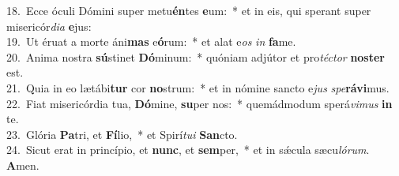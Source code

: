 {18.~}Ecce óculi Dómini super metu\textbf{én}tes \textbf{e}um:~* et in eis, qui sperant super misericór\textit{di}\textit{a} \textbf{e}jus:\\
{19.~}Ut éruat a morte áni\textbf{mas} e\textbf{ó}rum:~* et alat e\textit{os} \textit{in} \textbf{fa}me.\\
{20.~}Anima nostra \textbf{sú}stinet \textbf{Dó}minum:~* quóniam adjútor et pro\textit{té}\textit{ctor} \textbf{no}\textbf{ster} est.\\
{21.~}Quia in eo lætábi\textbf{tur} cor \textbf{no}strum:~* et in nómine sancto e\textit{jus} \textit{spe}\textbf{rá}\textbf{vi}mus.\\
{22.~}Fiat misericórdia tua, \textbf{Dó}mine, \textbf{su}per nos:~* quemádmodum sperá\textit{vi}\textit{mus} \textbf{in} te.\\
{23.~}Glória \textbf{Pa}tri, et \textbf{Fí}lio,~* et Spirí\textit{tu}\textit{i} \textbf{San}cto.\\
{24.~}Sicut erat in princípio, et \textbf{nunc}, et \textbf{sem}per,~* et in sǽcula sæcu\textit{ló}\textit{rum}. \textbf{A}men.\\
